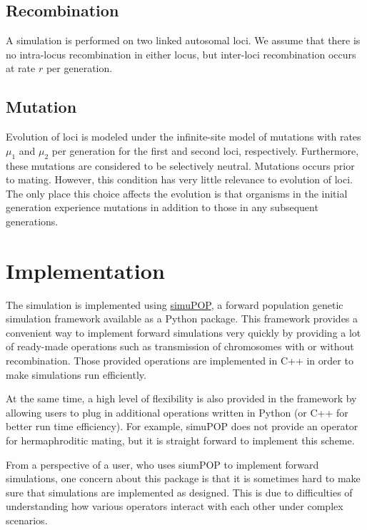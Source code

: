 \documentclass[12pt]{article}
\begin{document}
\subsection{Recombination}
\label{sec:recombination}

A simulation is performed on two linked autosomal loci.
We assume that there is no intra-locus recombination in either locus,
but inter-loci recombination occurs at rate \(r\) per generation.

\subsection{Mutation}
\label{sec:mutation}

Evolution of loci is modeled under the infinite-site model of
mutations with rates \(\mu_{1}\) and \(\mu_{2}\) per generation
for the first and second loci, respectively.
Furthermore, these mutations are considered to be selectively neutral.
Mutations occurs prior to mating.  However, this condition has
very little relevance to evolution of loci.
The only place this choice affects the evolution is that organisms in
the initial generation experience mutations in addition to those in
any subsequent generations.

\section{Implementation}
\label{sec:implementation}

The simulation is implemented using
\href{http://simupop.sourceforge.net/}{simuPOP}, a forward population
genetic simulation framework available as a Python package.
This framework provides a convenient way to implement forward
simulations very quickly by providing a lot of ready-made operations
such as transmission of chromosomes with or without recombination.
Those provided operations are implemented in C++ in order to make
simulations run efficiently.

At the same time, a high level of flexibility is also provided in the
framework by allowing users to plug in additional operations written
in Python (or C++ for better run time efficiency).
For example, simuPOP does not provide an operator for hermaphroditic
mating,
but it is straight forward to implement this scheme.

From a perspective of a user, who uses siumPOP to implement forward
simulations, one concern about this package is that it
is sometimes hard to make sure that simulations are implemented as
designed.
This is due to difficulties of understanding how various operators
interact with each other under complex scenarios.
\end{document}
